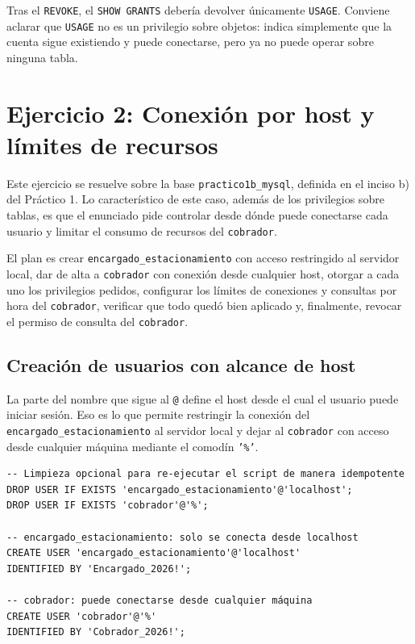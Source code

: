 \documentclass[11pt,a4paper]{article}
\begin{document}
Tras el \texttt{REVOKE}, el \texttt{SHOW GRANTS} debería devolver únicamente \texttt{USAGE}. Conviene aclarar que \texttt{USAGE} no es un privilegio sobre objetos: indica simplemente que la cuenta sigue existiendo y puede conectarse, pero ya no puede operar sobre ninguna tabla.

\section{Ejercicio 2: Conexión por host y límites de recursos}

Este ejercicio se resuelve sobre la base \texttt{practico1b\_mysql}, definida en el inciso b) del Práctico 1. Lo característico de este caso, además de los privilegios sobre tablas, es que el enunciado pide controlar desde dónde puede conectarse cada usuario y limitar el consumo de recursos del \texttt{cobrador}.

El plan es crear \texttt{encargado\_estacionamiento} con acceso restringido al servidor local, dar de alta a \texttt{cobrador} con conexión desde cualquier host, otorgar a cada uno los privilegios pedidos, configurar los límites de conexiones y consultas por hora del \texttt{cobrador}, verificar que todo quedó bien aplicado y, finalmente, revocar el permiso de consulta del \texttt{cobrador}.

\subsection{Creación de usuarios con alcance de host}

La parte del nombre que sigue al \texttt{@} define el host desde el cual el usuario puede iniciar sesión. Eso es lo que permite restringir la conexión del \texttt{encargado\_estacionamiento} al servidor local y dejar al \texttt{cobrador} con acceso desde cualquier máquina mediante el comodín \texttt{'\%'}.

\begin{lstlisting}
-- Limpieza opcional para re-ejecutar el script de manera idempotente
DROP USER IF EXISTS 'encargado_estacionamiento'@'localhost';
DROP USER IF EXISTS 'cobrador'@'%';

-- encargado_estacionamiento: solo se conecta desde localhost
CREATE USER 'encargado_estacionamiento'@'localhost'
IDENTIFIED BY 'Encargado_2026!';

-- cobrador: puede conectarse desde cualquier máquina
CREATE USER 'cobrador'@'%'
IDENTIFIED BY 'Cobrador_2026!';
\end{lstlisting}
\end{document}
